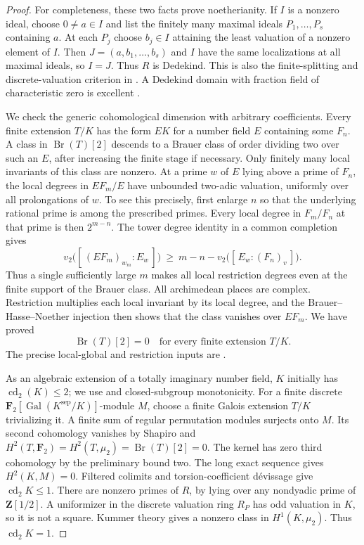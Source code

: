 \begin{proof}
For completeness, these two facts prove noetherianity. If $I$ is
a nonzero ideal, choose $0\ne a\in I$ and list the finitely many
maximal ideals $P_1,\ldots,P_s$ containing $a$. At each $P_j$
choose $b_j\in I$ attaining the least valuation of a nonzero
element of $I$. Then $J=(a,b_1,\ldots,b_s)$ and $I$ have the
same localizations at all maximal ideals, so $I=J$.
Thus $R$ is Dedekind. This is also the finite-splitting and
discrete-valuation criterion in \cite[Theorem and Corollary,
pp.~40--42]{C_PopescuVraciu1985}. A Dedekind domain with fraction
field of characteristic zero is excellent
\cite[Proposition 15.53.3(4), Tag 07QS]{C_StacksArithmetic}.

We check the generic cohomological dimension with arbitrary
coefficients. Every finite extension $T/K$ has the form $EK$
for a number field $E$ containing some $F_n$. A class in
$\operatorname{Br}(T)[2]$ descends to a Brauer class of order
dividing two over such an $E$, after increasing the finite
stage if necessary. Only finitely many local invariants of
this class are nonzero. At a prime $w$ of $E$ lying above a
prime of $F_n$, the local degrees in $EF_m/E$ have unbounded
two-adic valuation, uniformly over all prolongations of $w$.
To see this precisely, first enlarge $n$ so that the underlying
rational prime is among the prescribed primes. Every local
degree in $F_m/F_n$ at that prime is then $2^{m-n}$. The tower
degree identity in a common completion gives
\[
 v_2\bigl([\,(EF_m)_{w_m}:E_w\,]\bigr)
 \ \ge\ m-n-v_2\bigl([\,E_w:(F_n)_v\,]\bigr).
\]
Thus a single sufficiently large $m$ makes all local restriction
degrees even at the finite support of the Brauer class.
All archimedean places are complex. Restriction multiplies
each local invariant by its local degree, and the
Brauer--Hasse--Noether injection then shows that the class
vanishes over $EF_m$. We have proved
\[
            \operatorname{Br}(T)[2]=0
                 \quad\text{for every finite extension }T/K.
\]
The precise local-global and restriction inputs are
\cite[Chapter III, Proposition 1.8, p.~100; Chapter VII,
Theorem 7.1 and Proposition 7.2, pp.~219--220; Chapter VIII,
Theorem 4.2, p.~241]{C_MilneCFT2020}.

As an algebraic extension of a totally imaginary number field,
$K$ initially has $\operatorname{cd}_2(K)\le2$; we use
\cite[Proposition 8.3.18, with all primes in $S$]{A_NSW}
and closed-subgroup monotonicity. For a finite discrete
$\mathbf F_2[\operatorname{Gal}(K^{\mathrm{sep}}/K)]$-module $M$,
choose a finite Galois extension $T/K$ trivializing it.
A finite sum of regular permutation modules surjects onto $M$.
Its second cohomology vanishes by Shapiro and
$H^2(T,\mathbf F_2)=H^2(T,\mu_2)=\operatorname{Br}(T)[2]=0$.
The kernel has zero third cohomology by the preliminary bound two.
The long exact sequence gives $H^2(K,M)=0$. Filtered colimits
and torsion-coefficient d\'evissage give $\operatorname{cd}_2K\le1$.
There are nonzero primes of $R$, by lying over any nondyadic
prime of $\mathbf Z[1/2]$. A uniformizer in the discrete
valuation ring $R_P$ has odd valuation in $K$, so it is not a
square. Kummer theory gives a nonzero class in $H^1(K,\mu_2)$.
Thus $\operatorname{cd}_2K=1$.


\end{proof}
